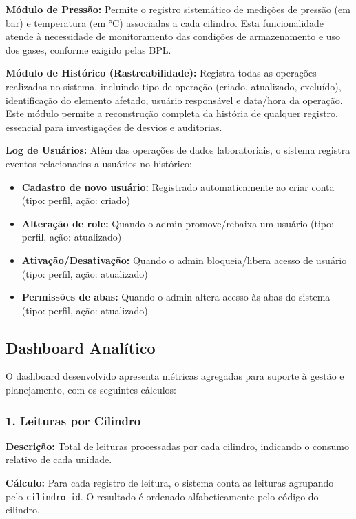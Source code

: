 \documentclass[12pt,a4paper]{article}
\begin{document}
\textbf{Módulo de Pressão:} Permite o registro sistemático de medições de pressão (em bar) e temperatura (em °C) associadas a cada cilindro. Esta funcionalidade atende à necessidade de monitoramento das condições de armazenamento e uso dos gases, conforme exigido pelas BPL.

\textbf{Módulo de Histórico (Rastreabilidade):} Registra todas as operações realizadas no sistema, incluindo tipo de operação (criado, atualizado, excluído), identificação do elemento afetado, usuário responsável e data/hora da operação. Este módulo permite a reconstrução completa da história de qualquer registro, essencial para investigações de desvios e auditorias.

\textbf{Log de Usuários:} Além das operações de dados laboratoriais, o sistema registra eventos relacionados a usuários no histórico:
\begin{itemize}
\item \textbf{Cadastro de novo usuário:} Registrado automaticamente ao criar conta (tipo: perfil, ação: criado)
\item \textbf{Alteração de role:} Quando o admin promove/rebaixa um usuário (tipo: perfil, ação: atualizado)
\item \textbf{Ativação/Desativação:} Quando o admin bloqueia/libera acesso de usuário (tipo: perfil, ação: atualizado)
\item \textbf{Permissões de abas:} Quando o admin altera acesso às abas do sistema (tipo: perfil, ação: atualizado)
\end{itemize}

\subsection{Dashboard Analítico}

O dashboard desenvolvido apresenta métricas agregadas para suporte à gestão e planejamento, com os seguintes cálculos:

\subsubsection{1. Leituras por Cilindro}

\textbf{Descrição:} Total de leituras processadas por cada cilindro, indicando o consumo relativo de cada unidade.

\textbf{Cálculo:} Para cada registro de leitura, o sistema conta as leituras agrupando pelo \texttt{cilindro\_id}. O resultado é ordenado alfabeticamente pelo código do cilindro.
\end{document}
